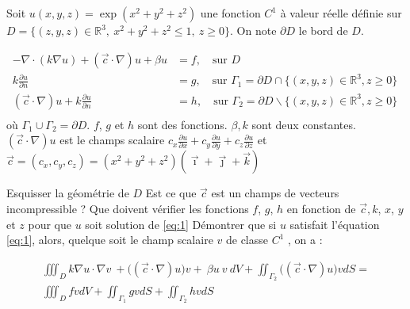 \documentclass[11pt]{article}
\begin{document}
\begin{Exercise}[label={ex:5}]


  Soit $u(x,y,z)=\exp(x^2+y^2+z^2)$ une fonction  $C^1$  à valeur réelle
  définie sur $D = \{ (z,y,z) \in \mathbb{R}^3,\ x^2+y^2+z^2 \leq 1,\ z \geq 0
  \}.$ On note $\partial D$ le bord de $D$.

  \begin{equation}
    \label{eq:1}
    \begin{array}{rl}
      \displaystyle - \nabla \cdot ( k \nabla u ) + (\vec{c} \cdot \nabla ) u
      + \beta u &= f, \quad \text{sur } D\\
       \displaystyle  k \frac{\partial u}{\partial n} &= g, \quad \text{sur
      } \Gamma_1 = \partial D \cap \{(x,y,z) \in \mathbb{R}^3, z\geq 0\} \\
      \displaystyle  (\vec{c} \cdot \nabla ) u + k \frac{\partial u}{\partial
      n} &= h, \quad \text{sur } \Gamma_2 = \partial D \backslash \{(x,y,z) \in \mathbb{R}^3,z\geq 0\}\  \\
    \end{array}
  \end{equation}
  où $\Gamma_1 \cup \Gamma_2 = \partial D$. $f$, $g$ et $h$ sont des fonctions. $\beta, k$ sont deux constantes. $(\vec{c} \cdot
  \nabla ) u$ est le champs scalaire $c_x \frac{\partial u}{\partial x} + c_y
  \frac{\partial u}{\partial y} + c_z \frac{\partial u}{\partial z}$ et
  $\vec{c} = (c_x,c_y, c_z) = (x^2+y^2+z^2)
  (\overrightarrow{\imath}+\overrightarrow{\jmath} +\overrightarrow{k})$

  \Question Esquisser la géométrie de $D$
  \Question Est ce que $\overrightarrow{c}$ est un champs de vecteurs incompressible ?
  \Question   Que doivent vérifier les fonctions $f$, $g$, $h$ en fonction de
  $\overrightarrow{c}, k$, $x$, $y$ et $z$ pour que $u$ soit solution de \ref{eq:1}
  \Question Démontrer que si $u$ satisfait l'équation \ref{eq:1}, alors, quelque soit le champ scalaire $v$ de classe $C^1$ ,
on a :



  \begin{multline}
  \label{eq:4}
    \iiint_D k \nabla u \cdot \nabla v\ + \big((\vec{c} \cdot \nabla) u\big)  v +\ \beta u\ v\ dV + \iint_{\Gamma_2}  \big((\vec{c} \cdot \nabla) u\big)  v dS  = \\
    \iiint_D fv dV + \iint_{\Gamma_1}  g v dS + \iint_{\Gamma_2}  h v dS
  \end{multline}



\end{Exercise}
\end{document}
